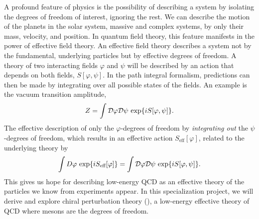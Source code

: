 A profound feature of physics is the possibility of describing a system by isolating the degrees of freedom of interest, ignoring the rest.
We can describe the motion of the planets in the solar system, massive and complex systems, by only their mass, velocity, and position.
In quantum field theory, this feature manifests in the power of effective field theory.
An effective field theory describes a system not by the fundamental, underlying particles but by effective degrees of freedom.
A theory of two interacting fields $\varphi$ and $\psi$ will be described by an action that depends on both fields, $S[\varphi, \psi]$.
In the path integral formalism, predictions can then be made by integrating over all possible states of the fields.
An example is the vacuum transition amplitude,
\begin{equation}
    Z = \int \mathcal{D} \varphi \mathcal{D} \psi \, \exp{i S[\varphi, \psi]}.
\end{equation}
The effective description of only the $\varphi$-degrees of freedom by \emph{integrating out} the $\psi$-degrees of freedom, which results in an effective action $S_\text{eff}[\varphi]$, related to the underlying theory by~\cite{Schwartz:QFT}
\begin{equation}
    \label{integrating out degrees of freedom}
    \int D \varphi \, \exp{i S_\text{eff}[\varphi]} 
    =
    \int \mathcal{D} \varphi \mathcal{D} \psi \, \exp{i S[\varphi, \psi]}.
\end{equation}
This gives us hope for describing low-energy QCD as an effective theory of the particles we know from experiments appear.
In this specialization project, we will derive and explore chiral perturbation theory (\chpt), a low-energy effective theory of QCD where mesons are the degrees of freedom.


